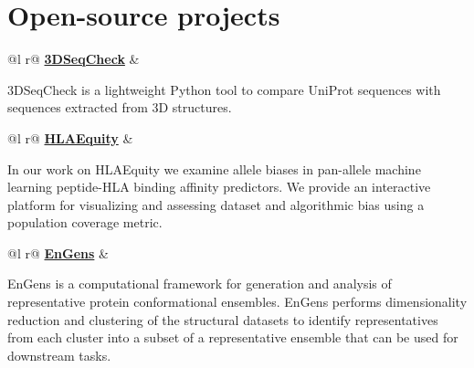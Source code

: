 \documentclass[a4paper,12pt]{article}
\begin{document}

\section{Open-source projects}

\begin{tabularx}{\linewidth}{ @{}l r@{} }
 \href{https://github.ic.ac.uk/ImperialCollegeLondon/check3Dseq}{\faGithub \textbf{3DSeqCheck}} &\\[3.75pt]
\begin{minipage}[t]{\linewidth}
3DSeqCheck is a lightweight Python tool to compare UniProt sequences with sequences extracted from 3D structures.
\end{minipage}
\end{tabularx}

\begin{tabularx}{\linewidth}{ @{}l r@{} }
 \href{https://github.com/KavrakiLab/HLAequity}{\faGithub \textbf{HLAEquity}} &\\[3.75pt]
\begin{minipage}[t]{\linewidth}
In our work on HLAEquity we examine allele biases in pan-allele machine learning peptide-HLA binding affinity predictors. We provide an interactive platform for visualizing and assessing dataset and algorithmic bias using a population coverage metric.   %
\end{minipage}
\end{tabularx}

\begin{tabularx}{\linewidth}{ @{}l r@{} }
 \href{https://github.com/KavrakiLab/EnGens}{\faGithub \textbf{EnGens}} &\\[3.75pt]
\begin{minipage}[t]{\linewidth}
EnGens is a computational framework for generation and analysis of representative protein conformational ensembles. EnGens performs dimensionality reduction and clustering of the structural datasets to identify representatives from each cluster into a subset of a representative ensemble that can be used for downstream tasks. %
\end{minipage}
\end{tabularx}
\end{document}
